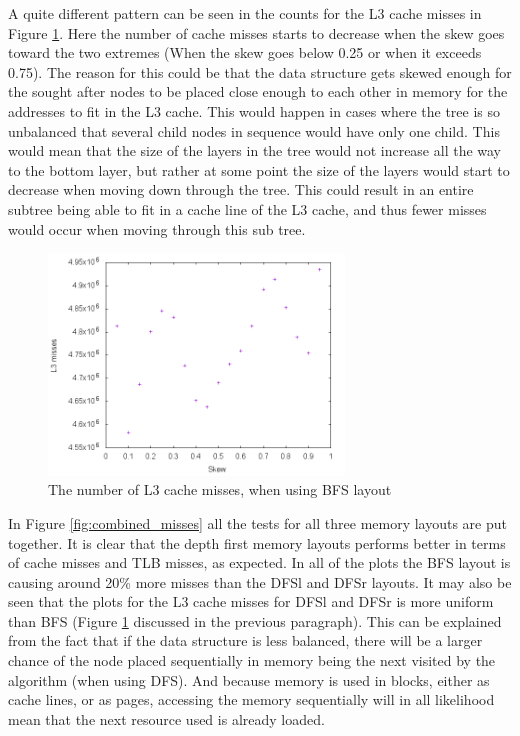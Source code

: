 \documentclass{article}
\begin{document}
A quite different pattern can be seen in the counts for the L3 cache misses in Figure \ref{fig:L3_misses_BFS}. Here the number of cache misses starts to decrease when the skew goes toward the two extremes (When the skew goes below 0.25 or when it exceeds 0.75). The reason for this could be that the data structure gets skewed enough for the sought after nodes to be placed close enough to each other in memory for the addresses to fit in the L3 cache. This would happen in cases where the tree is so unbalanced that several child nodes in sequence would have only one child. This would mean that the size of the layers in the tree would not increase all the way to the bottom layer, but rather at some point the size of the layers would start to decrease when moving down through the tree. This could result in an entire subtree being able to fit in a cache line of the L3 cache, and thus fewer misses would occur when moving through this sub tree.

\begin{figure}[H]
	\centering
	\includegraphics[width=0.7\textwidth]{figures/BFS_L3_misses}
	\caption{The number of L3 cache misses, when using BFS layout}
	\label{fig:L3_misses_BFS}
\end{figure}

In Figure \ref{fig:combined_misses} all the tests for all three memory layouts are put together. It is clear that the depth first memory layouts performs better in terms of cache misses and TLB misses, as expected. In all of the plots the BFS layout is causing around 20\% more misses than the DFSl and DFSr layouts. It may also be seen that the plots for the L3 cache misses for DFSl and DFSr is more uniform than BFS (Figure \ref{fig:L3_misses_BFS} discussed in the previous paragraph). This can be explained from the fact that if the data structure is less balanced, there will be a larger chance of the node placed sequentially in memory being the next visited by the algorithm  (when using DFS). And because memory is used in blocks, either as cache lines, or as pages, accessing the memory sequentially will in all likelihood mean that the next resource used is already loaded.
\end{document}
